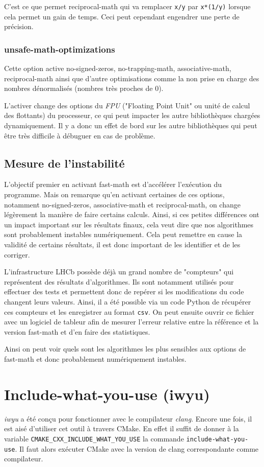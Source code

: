 \documentclass[a4paper,11pt]{report}
\begin{document}
C'est ce que permet reciprocal-math qui va remplacer \verb'x/y' par \verb'x*(1/y)' lorsque cela permet un gain de temps.
Ceci peut cependant engendrer une perte de précision.

\subsubsection{unsafe-math-optimizations}
Cette option active no-signed-zeros, no-trapping-math, associative-math, reciprocal-math ainsi que d'autre optimisations comme la non prise en charge des nombres dénormalisés (nombres très proches de $0$).

L'activer change des options du \emph{FPU} ("Floating Point Unit" ou unité de calcul des flottants) du processeur, ce qui peut impacter les autre bibliothèques chargées dynamiquement.
Il y a donc un effet de bord sur les autre bibliothèques qui peut être très difficile à débuguer en cas de problème.

\subsection{Mesure de l'instabilité}
L'objectif premier en activant fast-math est d'accélérer l'exécution du programme.
Mais on remarque qu'en activant certaines de ces options, notamment no-signed-zeros, associative-math et reciprocal-math, on change légèrement la manière de faire certains calculs.
Ainsi, si ces petites différences ont un impact important sur les résultats finaux, cela veut dire que nos algorithmes sont probablement instables numériquement.
Cela peut remettre en cause la validité de certains résultats, il est donc important de les identifier et de les corriger.

L'infrastructure LHCb possède déjà un grand nombre de "compteurs" qui représentent des résultats d'algorithmes.
Ils sont notamment utilisés pour effectuer des tests et permettent donc de repérer si les modifications du code changent leurs valeurs.
Ainsi, il a été possible via un code Python de récupérer ces compteurs et les enregistrer au format \verb'csv'.
On peut ensuite ouvrir ce fichier avec un logiciel de tableur afin de mesurer l'erreur relative entre la référence et la version fast-math et d'en faire des statistiques.

Ainsi on peut voir quels sont les algorithmes les plus sensibles aux options de fast-math et donc probablement numériquement instables.

\section{Include-what-you-use (iwyu)}
\emph{iwyu} a été conçu pour fonctionner avec le compilateur \emph{clang}.
Encore une fois, il est aisé d'utiliser cet outil à travers CMake.
En effet il suffit de donner à la variable \verb'CMAKE_CXX_INCLUDE_WHAT_YOU_USE' la commande \verb'include-what-you-use'.
Il faut alors exécuter CMake avec la version de clang correspondante comme compilateur.
\end{document}
